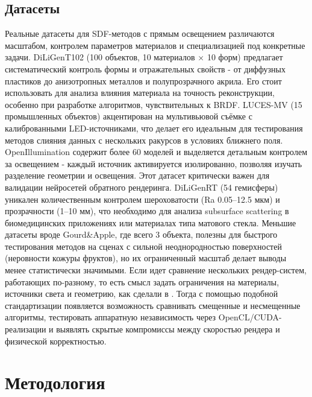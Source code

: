 \documentclass[a4paper,hidelinks,12pt]{article}
\begin{document}
\newpage

\subsection{Датасеты}

Реальные датасеты для SDF-методов с прямым освещением различаются масштабом, контролем параметров материалов и специализацией под 
конкретные задачи. \newline DiLiGenT102\cite{diligent102} (100 объектов, 10 материалов × 10 форм) предлагает систематический контроль формы и отражательных 
свойств - от диффузных пластиков до анизотропных металлов и полупрозрачного акрила. Его стоит использовать для анализа влияния материала 
на точность реконструкции, особенно при разработке алгоритмов, чувствительных к BRDF. LUCES-MV\cite{lucesmv} (15 промышленных объектов) акцентирован 
на мультивьювой съёмке с калиброванными LED-источниками, что делает его идеальным для тестирования методов слияния данных с нескольких 
ракурсов в условиях ближнего поля. OpenIllumination\cite{openillumination} содержит более 60 моделей и выделяется детальным контролем за освещением - каждый источник активируется изолированно, 
позволяя изучать разделение геометрии и освещения. Этот датасет критически важен для валидации нейросетей 
обратного рендеринга. DiLiGenRT\cite{diligenrt} (54 гемисферы) уникален количественным контролем шероховатости (Ra 0.05–12.5 мкм) 
и прозрачности (1–10 мм), что необходимо для анализа subsurface scattering в биомедицинских приложениях или материалах типа матового стекла.
Меньшие датасеты вроде Gourd\&Apple\cite{ga}, где всего 3 объекта, полезны для быстрого тестирования методов на сценах с сильной неоднородностью поверхностей (неровности кожуры фруктов), 
но их ограниченный масштаб делает выводы менее статистически значимыми. Если идет сравнение нескольких рендер-систем, работающих по-разному, то есть смысл 
задать ограничения на материалы, источники света и геометрию, как сделали в \cite{osrs}. Тогда с помощью подобной стандартизации появляется возможность сравнивать
смещенные и несмещенные алгоритмы, тестировать аппаратную независимость через OpenCL/CUDA-реализации и выявлять скрытые компромиссы между скоростью рендера и физической корректностью. 

\newpage

\section{Методология}
\end{document}
